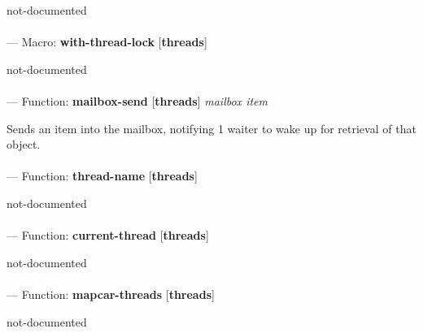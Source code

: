 \begin{adjustwidth}{5em}{5em}
not-documented
\end{adjustwidth}

\paragraph{}
\label{THREADS:WITH-THREAD-LOCK}
--- Macro: \textbf{with-thread-lock} [\textbf{threads}] \textit{}

\begin{adjustwidth}{5em}{5em}
not-documented
\end{adjustwidth}

\paragraph{}
\label{THREADS:MAILBOX-SEND}
--- Function: \textbf{mailbox-send} [\textbf{threads}] \textit{mailbox item}

\begin{adjustwidth}{5em}{5em}
Sends an item into the mailbox, notifying 1 waiter
to wake up for retrieval of that object.
\end{adjustwidth}

\paragraph{}
\label{THREADS:THREAD-NAME}
--- Function: \textbf{thread-name} [\textbf{threads}] \textit{}

\begin{adjustwidth}{5em}{5em}
not-documented
\end{adjustwidth}

\paragraph{}
\label{THREADS:CURRENT-THREAD}
--- Function: \textbf{current-thread} [\textbf{threads}] \textit{}

\begin{adjustwidth}{5em}{5em}
not-documented
\end{adjustwidth}

\paragraph{}
\label{THREADS:MAPCAR-THREADS}
--- Function: \textbf{mapcar-threads} [\textbf{threads}] \textit{}

\begin{adjustwidth}{5em}{5em}
not-documented
\end{adjustwidth}


